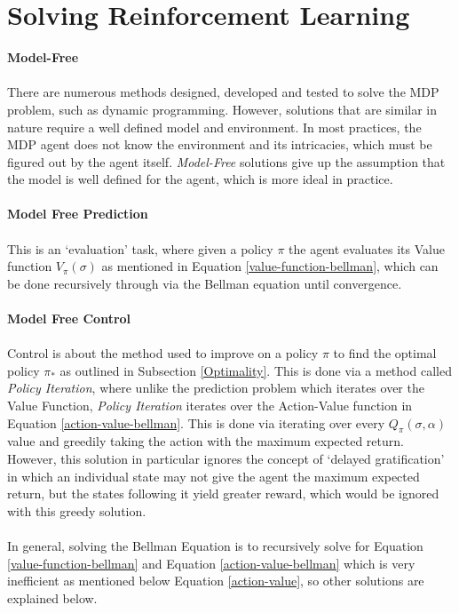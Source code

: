 \documentclass[ %
                    author={Ashwinder Khurana},
                supervisor={Prof Dave Cliff},
                    degree={MEng},
                     title={The Deeply Reinforced Trader},
                  subtitle={},
                      type={enterprise},
                      year={2020} ]{dissertation}
\begin{document}
{\section{Solving Reinforcement Learning}
\label{section:Solving Reinforcment Learning}
\textbf{Model-Free}
\\
\\
There are numerous methods designed, developed and tested to solve the MDP problem, such as dynamic programming. However, solutions that are similar in nature require a well defined model and environment. In most practices, the MDP agent does not know the environment and its intricacies, which must be figured out by the agent itself. \textit{Model-Free} solutions give up the assumption that the model is well defined for the agent, which is more ideal in practice.
\\
\\
\textbf{Model Free Prediction} 
\\
\\
This is an \enquote*{evaluation} task, where given a policy $\pi$ the agent evaluates its Value function $V_\pi(\sigma)$ as mentioned in Equation \ref{value-function-bellman}, which can be done recursively through via the Bellman equation until convergence. 
\\
\\
\textbf{Model Free Control}
\\
\\
\noindent
Control is about the method used to improve on a policy $\pi$ to find the optimal policy $\pi_*$ as outlined in Subsection \ref{Optimality}. This is done via a method called \textit{Policy Iteration}, where unlike the prediction problem which iterates over the Value Function, \textit{Policy Iteration} iterates over the Action-Value function in Equation \ref{action-value-bellman}. This is done via iterating over every $Q_\pi(\sigma, \alpha)$ value and greedily taking the action with the maximum expected return. However, this solution in particular ignores the concept of \enquote*{delayed gratification} in which an individual state may not give the agent the maximum expected return, but the states following it yield greater reward, which would be ignored with this greedy solution. 
\\
\\
\noindent
In general, solving the Bellman Equation is to recursively solve for Equation \ref{value-function-bellman} and Equation \ref{action-value-bellman} which is very inefficient as mentioned below Equation \ref{action-value}, so other solutions are explained below. 

}
\end{document}
